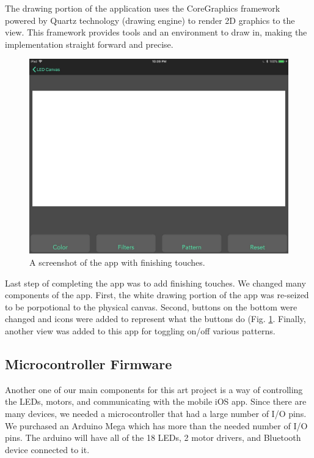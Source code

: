 \documentclass[11pt]{IEEEtran}
\begin{document}
The drawing portion of the application uses the CoreGraphics framework powered by Quartz technology (drawing engine) to render 2D graphics to the view. This framework provides tools and an environment to draw in, making the implementation straight forward and precise.

\begin{figure}[H]
  \centering
  \includegraphics[width=\columnwidth]{ios_app_updated.jpg}
  \caption{A screenshot of the app with finishing touches.}
  \label{fig:iosappupdate}
\end{figure}

Last step of completing the app was to add finishing touches. We changed many components of the app. First, the white drawing portion of the app was re-seized to be porpotional to the physical canvas. Second, buttons on the bottom were changed and icons were added to represent what the buttons do (Fig. \ref{fig:iosappupdate}. Finally, another view was added to this app for toggling on/off various patterns.

\subsection{Microcontroller Firmware}
Another one of our main components for this art project is a way of controlling the LEDs, motors, and communicating with the mobile iOS app. Since there are many devices, we needed a microcontroller that had a large number of I/O pins. We purchased an Arduino Mega which has more than the needed number of I/O pins. The arduino will have all of the 18 LEDs, 2 motor drivers, and Bluetooth device connected to it.
\end{document}
